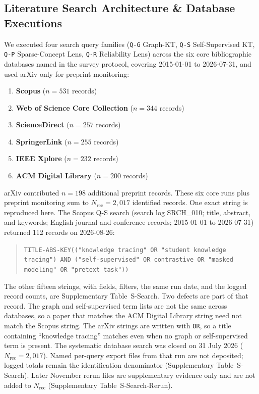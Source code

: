 \documentclass[lettersize,journal]{IEEEtran}
\begin{document}
\subsection{Literature Search Architecture \& Database Executions}
We executed four search query families (\texttt{Q-G} Graph-KT, \texttt{Q-S} Self-Supervised KT, \texttt{Q-P} Sparse-Concept Lens, \texttt{Q-R} Reliability Lens) across the six core bibliographic databases named in the survey protocol, covering 2015-01-01 to 2026-07-31, and used arXiv only for preprint monitoring:
\begin{enumerate}
    \item \textbf{Scopus} ($n = 531$ records)
    \item \textbf{Web of Science Core Collection} ($n = 344$ records)
    \item \textbf{ScienceDirect} ($n = 257$ records)
    \item \textbf{SpringerLink} ($n = 255$ records)
    \item \textbf{IEEE Xplore} ($n = 232$ records)
    \item \textbf{ACM Digital Library} ($n = 200$ records)
\end{enumerate}
arXiv contributed $n = 198$ additional preprint records. These six core runs plus preprint monitoring sum to $N_{\mathrm{rec}} = 2{,}017$ identified records. One exact string is reproduced here. The Scopus Q-S search (search log SRCH\_010; title, abstract, and keywords; English journal and conference records; 2015-01-01 to 2026-07-31) returned 112 records on 2026-08-26:
\begin{quote}
\texttt{TITLE-ABS-KEY(("knowledge tracing" OR "student knowledge tracing") AND ("self-supervised" OR contrastive OR "masked modeling" OR "pretext task"))}
\end{quote}
The other fifteen strings, with fields, filters, the same run date, and the logged record counts, are Supplementary Table~S-Search. Two defects are part of that record. The graph and self-supervised term lists are not the same across databases, so a paper that matches the ACM Digital Library string need not match the Scopus string. The arXiv strings are written with \texttt{OR}, so a title containing ``knowledge tracing'' matches even when no graph or self-supervised term is present. The systematic database search was closed on 31 July 2026 ($N_{\mathrm{rec}}=2{,}017$). Named per-query export files from that run are not deposited; logged totals remain the identification denominator (Supplementary Table~S-Search). Later November rerun files are supplementary evidence only and are not added to $N_{\mathrm{rec}}$ (Supplementary Table~S-Search-Rerun).
\end{document}
